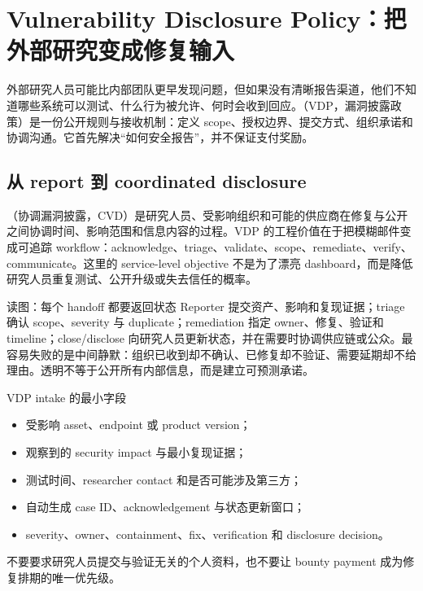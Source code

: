 \section{Vulnerability Disclosure Policy：把外部研究变成修复输入}

外部研究人员可能比内部团队更早发现问题，但如果没有清晰报告渠道，他们不知道哪些系统可以测试、什么行为被允许、何时会收到回应。（VDP，漏洞披露政策）是一份公开规则与接收机制：定义 scope、授权边界、提交方式、组织承诺和协调沟通。它首先解决“如何安全报告”，并不保证支付奖励。

\subsection{从 report 到 coordinated disclosure}

（协调漏洞披露，CVD）是研究人员、受影响组织和可能的供应商在修复与公开之间协调时间、影响范围和信息内容的过程。VDP 的工程价值在于把模糊邮件变成可追踪 workflow：acknowledge、triage、validate、scope、remediate、verify、communicate。这里的 service-level objective 不是为了漂亮 dashboard，而是降低研究人员重复测试、公开升级或失去信任的概率。


\begin{knowledgebox}{读图：每个 handoff 都要返回状态}
Reporter 提交资产、影响和复现证据；triage 确认 scope、severity 与 duplicate；remediation 指定 owner、修复、验证和 timeline；close/disclose 向研究人员更新状态，并在需要时协调供应链或公众。最容易失败的是中间静默：组织已收到却不确认、已修复却不验证、需要延期却不给理由。透明不等于公开所有内部信息，而是建立可预测承诺。
\end{knowledgebox}

\begin{importantbox}{VDP intake 的最小字段}
\begin{itemize}
  \item 受影响 asset、endpoint 或 product version；
  \item 观察到的 security impact 与最小复现证据；
  \item 测试时间、researcher contact 和是否可能涉及第三方；
  \item 自动生成 case ID、acknowledgement 与状态更新窗口；
  \item severity、owner、containment、fix、verification 和 disclosure decision。
\end{itemize}
不要要求研究人员提交与验证无关的个人资料，也不要让 bounty payment 成为修复排期的唯一优先级。
\end{importantbox}

